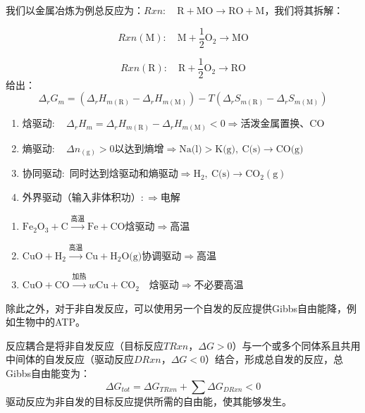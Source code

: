 我们以金属冶炼为例总反应为：$Rxn: \quad \text{R} + \text{MO} \longrightarrow \text{RO} + \text{M}$，我们将其拆解：

$$Rxn(\text{M}): \quad \text{M} + \frac{1}{2}\text{O}_2 \longrightarrow \text{MO}$$

$$Rxn(\text{R}): \quad \text{R} + \frac{1}{2}\text{O}_2 \longrightarrow \text{RO}$$
给出：
$$\Delta_r G_m = \left( \Delta_r H_{m(\text{R})} - \Delta_r H_{m(\text{M})} \right) - T\left( \Delta_r S_{m(\text{R})} - \Delta_r S_{m(\text{M})} \right)$$

\begin{enumerate}
  \item $\text{焓驱动}: \quad \Delta_r H_m = \Delta_r H_{m(\text{R})} - \Delta_r H_{m(\text{M})}<0 \Rightarrow \text{活泼金属置换、CO}$
  \item $\text{熵驱动}: \quad \Delta n_{(\text{g})} > 0 \text{以达到熵增} \Rightarrow \text{Na(l)} > \text{K(g)},\ \text{C(s)} \to \text{CO(g)}$
  \item $\text{协同驱动}:\text{ 同时达到焓驱动和熵驱动}\text{}\Rightarrow \text{H}_2,\ \text{C(s)} \to \text{CO}_2(\text{g})$
  \item $\text{外界驱动（输入非体积功）}: \Rightarrow \text{电解}$
\end{enumerate}


\begin{example}[化学反应的条件判断]
  \begin{enumerate}
    \item $\text{Fe}_2\text{O}_3 + \text{C} \xrightarrow{\text{高温}} \text{Fe} + \text{CO} \text{焓驱动}\Longrightarrow \text{高温}$ 
    \item $\text{CuO} + \text{H}_2 \xrightarrow{\text{高温}} \text{Cu} + \text{H}_2\text{O(g)} \text{协调驱动}\Longrightarrow \text{高温}$
    \item $\text{CuO} + \text{CO} \xrightarrow{\text{加热}} w \text{Cu} + \text{CO}_2 \quad \text{焓驱动}\Longrightarrow \text{不必要高温}$
  \end{enumerate}
\end{example}

除此之外，对于非自发反应，可以使用另一个自发的反应提供Gibbs自由能降，例如生物中的ATP。

\begin{definition}[反应耦合]
反应耦合是将非自发反应（目标反应$TRxn$，$\Delta G > 0$）与一个或多个同体系且共用中间体的自发反应（驱动反应$DRxn$，$\Delta G < 0$）结合，形成总自发的反应，总Gibbs自由能变为：
$$\Delta G_{tot} = \Delta G_{TRxn} + \sum \Delta G_{DRxn} < 0$$
驱动反应为非自发的目标反应提供所需的自由能，使其能够发生。
\end{definition}

